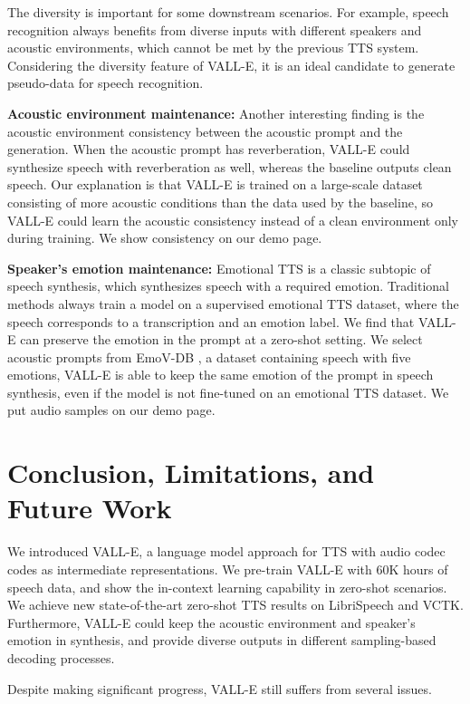 \documentclass{article}
\theoremstyle{plain}
\theoremstyle{definition}
\theoremstyle{remark}
\newcommand\our{\textsc{VALL-E}}
\begin{document}
The diversity is important for some downstream scenarios. For example,  speech recognition always benefits from diverse inputs with different speakers and acoustic environments, which cannot be met by the previous TTS system. Considering the diversity feature of \our{}, it is an ideal candidate to generate pseudo-data for speech recognition. 

\textbf{Acoustic environment maintenance:} Another interesting finding is the acoustic environment consistency between the acoustic prompt and the generation. When the acoustic prompt has reverberation, \our{} could synthesize speech with reverberation as well, whereas the baseline outputs clean speech. Our explanation is that \our{} is trained on a large-scale dataset consisting of more acoustic conditions than the data used by the baseline, so \our{} could learn the acoustic consistency instead of a clean environment only during training.  We show consistency on our demo page. 

\textbf{Speaker's emotion maintenance:} Emotional TTS is a classic subtopic of speech synthesis, which synthesizes speech with a required emotion. Traditional methods \citep{lei2021fine} always train a model on a supervised emotional TTS dataset, where the speech corresponds to a transcription and an emotion label. We find that \our{} can preserve the emotion in the prompt at a zero-shot setting. We select acoustic prompts from EmoV-DB \citep{adigwe2018emotional}, a dataset containing speech with five emotions, \our{} is able to keep the same emotion of the prompt in speech synthesis, even if  the model is not fine-tuned on an emotional TTS dataset. We put audio samples on our demo page.



\section{Conclusion, Limitations, and Future Work}
We introduced \our{}, a language model approach for TTS with audio codec codes
as intermediate representations.
We pre-train \our{} with 60K hours of speech data, and show the in-context learning capability in zero-shot scenarios. We achieve new state-of-the-art zero-shot TTS results on LibriSpeech and VCTK. Furthermore, \our{} could keep the acoustic environment and speaker's emotion in synthesis, and provide diverse outputs in different sampling-based decoding processes.  

Despite making significant progress, \our{} still suffers from several issues. 
\end{document}
